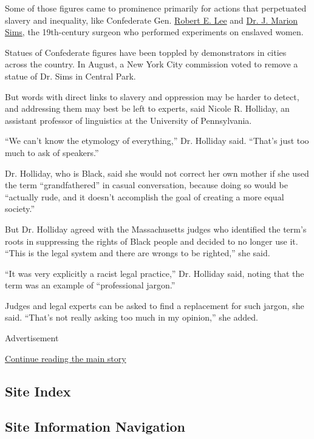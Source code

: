 Some of those figures came to prominence primarily for actions that
perpetuated slavery and inequality, like Confederate Gen.
\href{https://www.nytimes.com/2020/06/18/us/confederate-statues-monuments-removal.html}{Robert
E. Lee} and
\href{https://www.nytimes.com/2018/04/16/nyregion/nyc-sims-statue-central-park-monument.html}{Dr.
J. Marion Sims}, the 19th-century surgeon who performed experiments on
enslaved women.

Statues of Confederate figures have been toppled by demonstrators in
cities across the country. In August, a New York City commission voted
to remove a statue of Dr. Sims in Central Park.

But words with direct links to slavery and oppression may be harder to
detect, and addressing them may best be left to experts, said Nicole R.
Holliday, an assistant professor of linguistics at the University of
Pennsylvania.

``We can't know the etymology of everything,'' Dr. Holliday said.
``That's just too much to ask of speakers.''

Dr. Holliday, who is Black, said she would not correct her own mother if
she used the term ``grandfathered'' in casual conversation, because
doing so would be ``actually rude, and it doesn't accomplish the goal of
creating a more equal society.''

But Dr. Holliday agreed with the Massachusetts judges who identified the
term's roots in suppressing the rights of Black people and decided to no
longer use it. ``This is the legal system and there are wrongs to be
righted,'' she said.

``It was very explicitly a racist legal practice,'' Dr. Holliday said,
noting that the term was an example of ``professional jargon.''

Judges and legal experts can be asked to find a replacement for such
jargon, she said. ``That's not really asking too much in my opinion,''
she added.

Advertisement

\protect\hyperlink{after-bottom}{Continue reading the main story}

\hypertarget{site-index}{%
\subsection{Site Index}\label{site-index}}

\hypertarget{site-information-navigation}{%
\subsection{Site Information
Navigation}\label{site-information-navigation}}

